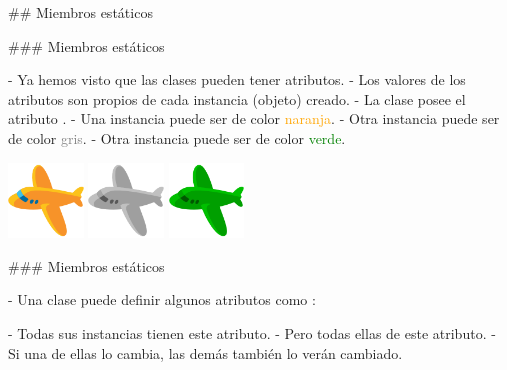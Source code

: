\centering{}

## Miembros estáticos

### Miembros estáticos


- Ya hemos visto que las clases pueden tener atributos.
    - Los valores de los atributos son propios de cada instancia (objeto) creado.
        - La clase  posee el atributo .
        - Una instancia puede ser de color \textcolor{orange}{naranja}.
        - Otra instancia puede ser de color \textcolor{gray}{gris}.
        - Otra instancia puede ser de color \textcolor{green}{verde}.

\vfill

\columnsbegin
{}
\centering\includegraphics[width=20mm]{icons/92-emoji_android_airplane.png}
\centering\includegraphics[width=20mm]{icons/92-emoji_android_airplane_gray.png}
\centering\includegraphics[width=20mm]{icons/92-emoji_android_airplane_green.png}
\columnsend

### Miembros estáticos


- Una clase puede definir algunos atributos como :

\buildrboxx[0.9\textwidth]{}

- Todas sus instancias tienen este atributo.
- Pero todas ellas  de este atributo.
    - Si una de ellas lo cambia, las demás también lo verán cambiado.

